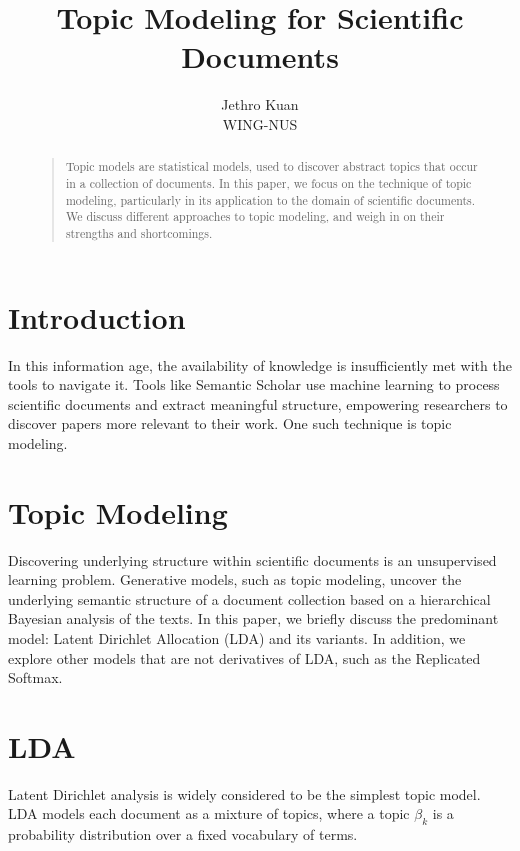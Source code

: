 \documentclass[letterpaper]{article}
\begin{document}
\nocopyright


\title{Topic Modeling for Scientific Documents}
\author{Jethro Kuan \\
  WING-NUS\\
}
\maketitle
\begin{abstract}
  \begin{quote}
    Topic models are statistical models, used to discover abstract
    topics that occur in a collection of documents. In this paper, we
    focus on the technique of topic modeling, particularly in its
    application to the domain of scientific documents. We discuss
    different approaches to topic modeling, and weigh in on their
    strengths and shortcomings.
  \end{quote}
\end{abstract}

\section{Introduction}
In this information age, the availability of knowledge is
insufficiently met with the tools to navigate it. Tools like Semantic
Scholar use machine learning to process scientific documents and
extract meaningful structure, empowering researchers to discover
papers more relevant to their work. One such technique is topic
modeling.

\section {Topic Modeling}
Discovering underlying structure within scientific documents is an
unsupervised learning problem. Generative models, such as topic
modeling, uncover the underlying semantic structure of a document
collection based on a hierarchical Bayesian analysis of the texts. In
this paper, we briefly discuss the predominant model: Latent Dirichlet
Allocation (LDA) and its variants. In addition, we explore other
models that are not derivatives of LDA, such as the Replicated Softmax.

\section{LDA}
Latent Dirichlet analysis is widely considered to be the simplest
topic model. LDA models each document as a mixture of topics, where a
topic $\beta_k$ is a probability distribution over a fixed vocabulary
of terms.
\end{document}
